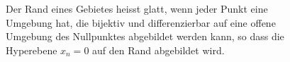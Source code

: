 %
%
\begin{figure}
\centering
\caption{Der Rand eines Gebietes heisst glatt, wenn jeder Punkt eine
Umgebung hat, die bijektiv und differenzierbar auf eine offene Umgebung
des Nullpunktes abgebildet werden kann, so dass die Hyperebene $x_n=0$
auf den Rand abgebildet wird.
\label{buch:felder:fundamentallemma:fig:randdef}}
\end{figure}
